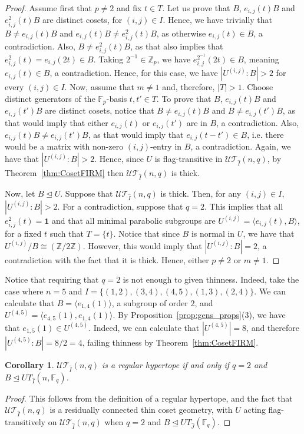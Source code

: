 \documentclass[11pt,letterpaper]{amsart}
\newtheorem{coro}[theorem]{Corollary}
\newcommand{\TT}{\mathcal{T}}
\newcommand{\ZZ}{\mathbb{Z}}
\newcommand{\FF}{\mathbb{F}}
\newcommand{\UU}{\mathcal{U}}
\begin{document}
\begin{proof}
    Assume first that $p\neq 2$ and fix $t\in T$. Let us prove that $B$, $e_{i,j}(t)B$ and $e_{i,j}^2(t)B$ are distinct cosets, for $(i,j)\in I$.  Hence, we have trivially that $B \neq e_{i,j}(t)B$ and $e_{i,j}(t)B \neq e_{i,j}^2(t)B$, as otherwise $e_{i,j}(t)\in B$, a contradiction. Also, $B \neq e_{i,j}^2(t)B$, as that also implies that $e^2_{i,j}(t)=e_{i,j}(2t)\in B$. Taking $2^{-1}\in \ZZ_p$, we have $e^{2^{-1}}_{i,j}(2t)\in B$, meaning $e_{i,j}(t)\in B$, a contradiction. Hence, for this case, we have $|U^{(i,j)}:B|>2$  for every $(i,j)\in I$.
    Now, assume that $m\neq 1$ and, therefore, $|T|>1$. Choose distinct generators of the $\FF_p$-basis $t,t'\in T$. To prove that $B$, $e_{i,j}(t)B$ and $e_{i,j}(t')B$ are distinct cosets, notice that $B\neq e_{i,j}(t)B$ and $B \neq e_{i,j}(t')B$, as that would imply that either $e_{i,j}(t)$ or $e_{i,j}(t')$ are in $B$, a contradiction. Also, $e_{i,j}(t)B \neq e_{i,j}(t')B$, as that would imply that $e_{i,j}(t-t')\in B$, i.e. there would be a matrix with non-zero $(i,j)$-entry in $B$, a contradiction.
    Again, we have that $|U^{(i,j)}:B|>2$.
    Hence, since $U$ is flag-transitive in $\UU\TT_{\widehat{I}}(n,q)$, by Theorem~\ref{thm:CosetFIRM} then $\UU\TT_{\widehat{I}}(n,q)$ is thick.
    
    Now, let $B\trianglelefteq U$. Suppose that $\UU\TT_{\widehat{I}}(n,q)$ is thick. Then, for any $(i,j)\in I$, $|U^{(i,j)}:B|>2$. For a contradiction, suppose that $q=2$. This implies that all $e_{i,j}^2(t)=\textbf{1}$ and that
    all minimal parabolic subgroups are $U^{(i,j)}=\langle e_{i,j}(t), B\rangle$, for a fixed $t$ such that $T=\{t\}$. Notice that since $B$ is normal in $U$, we have that $U^{(i,j)}/B \cong (\ZZ/2\ZZ)$. However, this would imply that $|U^{(i,j)}:B|=2$, a contradiction with the fact that it is thick. Hence, either $p\neq 2$ or $m\neq 1$.

\end{proof}

Notice that requiring that $q=2$ is not enough to given thinness. Indeed, take the case where $n=5$ and $I=\{ (1, 2 ), ( 3, 4 ), ( 4, 5 ), ( 1, 3 ), ( 2, 4 )\}$.
We can calculate that $B=\langle e_{1,4}(1)\rangle$, a subgroup of order $2$, and $U^{(4,5)}=\langle e_{4,5}(1),e_{1,4}(1)\rangle$.
By Proposition~\ref{prop:gens_props}(3), we have that $e_{1,5}(1)\in U^{(4,5)}$. Indeed, we can calculate that $|U^{(4,5)}|=8$, and therefore $|U^{(4,5)}:B|=8/2 = 4$, failing thinness by Theorem~\ref{thm:CosetFIRM}.



\begin{coro}\label{coro:Pattern_with_q=2_hyper}
    $\UU\TT_{\widehat{I}}(n,q)$ is a regular hypertope if and only if $q=2$ and $B\trianglelefteq UT_{\widehat{I}}(n,\FF_q)$.
\end{coro}
\begin{proof}
This follows from the definition of a regular hypertope, and the fact that $\UU\TT_{\widehat{I}}(n,q)$ is a residually connected thin coset geometry, with $U$ acting flag-transitively on $\UU\TT_{\widehat{I}}(n,q)$ when $q=2$ and $B\trianglelefteq UT_{\widehat{J}}(\FF_q)$.
\end{proof}
\end{document}
